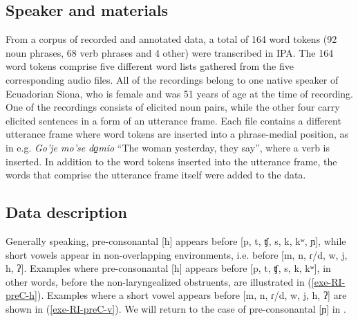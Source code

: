 \documentclass[output=paper]{langscibook}
\begin{document}
\subsection{Speaker and materials}\label{sec-speak}
From a corpus of recorded and annotated data, a total of 164 word tokens (92 noun phrases, 68 verb phrases and 4 other) were transcribed in IPA. The 164 word tokens comprise five different word lists gathered from the five corresponding audio files. All of the recordings belong to one native speaker of Ecuadorian Siona, who is female and was 51 years of age at the time of recording. One of the recordings consists of elicited noun pairs, while the other four carry elicited sentences in a form of an utterance frame. Each file contains a different utterance frame where word tokens are inserted into a phrase-medial position, as in e.g. \textit{Go’je mo’se \detokenize{___} do̠mio} “The woman \detokenize{___} yesterday, they say”, where a verb is inserted. In addition to the word tokens inserted into the utterance frame, the words that comprise the utterance frame itself were added to the data. 


\subsection{Data description}
Generally speaking, pre-consonantal [h] appears before [p, t, ʧ, s, k, kʷ, ɲ], while short vowels appear in non-overlapping environments, i.e. before [m, n, ɾ/d, w, j, h, ʔ]. Examples where pre-consonantal [h] appears before [p, t, ʧ, s, k, kʷ], in other words, before the non-laryngealized obstruents, are illustrated in (\ref{exe-RI-preC-h}). Examples where a short vowel appears before [m, n, ɾ/d, w, j, h, ʔ] are shown in (\ref{exe-RI-preC-v}). We will return to the case of pre-consonantal [ɲ] in .
\end{document}

